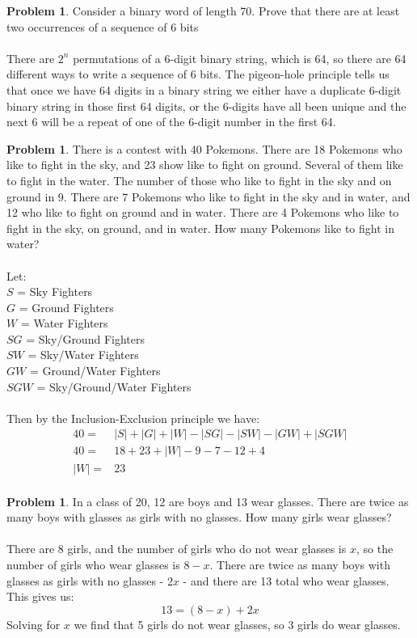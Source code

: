 \documentclass[10pt,leqno ]{article}
\theoremstyle{definition}
\newtheorem{problem}[theorem]{Problem}
\begin{document}
\begin{problem} Consider a binary word of length 70.  Prove that there are at least two occurrences of a sequence of 6 bits
\\\\
\Large
There are $2^n$ permutations of a 6-digit binary string, which is 64, so there are 64 different ways to write a sequence of 6 bits.  The pigeon-hole principle tells us that once we have 64 digits in a binary string we either have a duplicate 6-digit binary string in those first 64 digits, or the 6-digits have all been unique and the next 6 will be a repeat of one of the 6-digit number in the first 64.
\end{problem}
\newpage

\begin{problem} There is a contest with 40 Pokemons.  There are 18 Pokemons who like to fight in the sky, and 23 show like to fight on ground.  Several of them like to fight in the water.  The number of those who like to fight in the sky and on ground in 9.  There are 7 Pokemons who like to fight in the sky and in water, and 12 who like to fight on ground and in water.  There are 4 Pokemons who like to fight in the sky, on ground, and in water.  How many Pokemons like to fight in water?
\\\\
\Large
Let:\\
$S$ = Sky Fighters\\
$G$ = Ground Fighters\\
$W$ = Water Fighters\\
$SG$ = Sky/Ground Fighters\\
$SW$ = Sky/Water Fighters\\
$GW$ = Ground/Water Fighters\\
$SGW$ = Sky/Ground/Water Fighters\\\\
Then by the Inclusion-Exclusion principle we have:
\begin{align*}
40 =& |S| + |G| + |W| - |SG| - |SW| - |GW| + |SGW|\\
40 =& 18 + 23 + |W| - 9 - 7 - 12 + 4\\
|W| =& 23\\
\end{align*}
\end{problem}
\newpage

\begin{problem}  In a class of 20, 12 are boys and 13 wear glasses.  There are twice as many boys with glasses as girls with no glasses.  How many girls wear glasses?
\\\\
\Large
There are 8 girls, and the number of girls who do not wear glasses is $x$, so the number of girls who wear glasses is $8-x$.  There are twice as many boys with glasses as girls with no glasses - $2x$ - and there are 13 total who wear glasses.  This gives us:
$$13 = (8-x) + 2x$$
Solving for $x$ we find that 5 girls do not wear glasses, so 3 girls do wear glasses.
\end{problem}
\newpage
\end{document}
